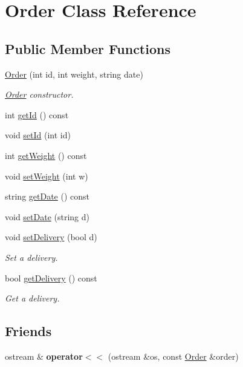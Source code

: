 \hypertarget{class_order}{}\section{Order Class Reference}
\label{class_order}
\subsection*{Public Member Functions}
\begin{DoxyCompactItemize}
\item 
\hyperlink{class_order_a9a3573b4fb389728497074b91aff483f}{Order} (int id, int weight, string date)
\begin{DoxyCompactList}\small\item\em \hyperlink{class_order}{Order} constructor. \end{DoxyCompactList}\item 
int \hyperlink{class_order_a9506e43ee697e335b3e0e3ad04f4d8fa}{get\+Id} () const
\item 
void \hyperlink{class_order_ac2e6861304117b7f0170af983ec4ad14}{set\+Id} (int id)
\item 
int \hyperlink{class_order_ac0631c875d8dbfbf296cdeadbef15280}{get\+Weight} () const
\item 
void \hyperlink{class_order_a519b7f621632b0e1ae0d556f0a95783e}{set\+Weight} (int w)
\item 
string \hyperlink{class_order_aadcbbbdc86894fc1bb145277af4cde8c}{get\+Date} () const
\item 
void \hyperlink{class_order_af48cd8aa6f874ba9960d07a4764440b7}{set\+Date} (string d)
\item 
void \hyperlink{class_order_a2ceb0b81d58b2bdc506bc653d61b4104}{set\+Delivery} (bool d)
\begin{DoxyCompactList}\small\item\em Set a delivery. \end{DoxyCompactList}\item 
bool \hyperlink{class_order_a5ca974845066337f8bed2f94133c7786}{get\+Delivery} () const
\begin{DoxyCompactList}\small\item\em Get a delivery. \end{DoxyCompactList}\end{DoxyCompactItemize}
\subsection*{Friends}
\begin{DoxyCompactItemize}
\item 
\mbox{\label{class_order_a4d5abe3842ede10f4425db34b0354151}} 
ostream \& {\bfseries operator$<$$<$} (ostream \&os, const \hyperlink{class_order}{Order} \&order)
\end{DoxyCompactItemize}


